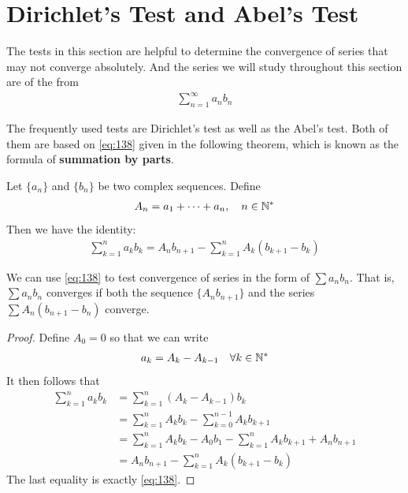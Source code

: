 \documentclass[thmcnt=section, 12pt]{my-elegantbook}
\begin{document}

\section{Dirichlet's Test and Abel's Test}

The tests in this section are helpful
to determine the convergence of series
that may not converge absolutely.
And the series we will study
throughout this section are of the from
\begin{align*}
    \sum_{n=1}^\infty a_n b_n
\end{align*}


The frequently used tests are Dirichlet's test
as well as the Abel's test.
Both of them are based on
\eqref{eq:138} given in the following theorem,
which is known as the formula of
\textbf{summation by parts}.

\begin{theorem} \label{thm:73}
    Let $\{a_n\}$ and $\{b_n\}$ be two complex sequences.
    Define
    \begin{align*}
        A_n = a_1 + \cdots + a_n,
        \quad n \in \mathbb{N}^\ast
    \end{align*}
    Then we have the identity:
    \begin{align}
        \sum_{k=1}^n a_k b_k
        = A_n b_{n+1}
        - \sum_{k=1}^n A_k (b_{k+1} - b_k)
        \label{eq:138}
    \end{align}
\end{theorem}

\begin{note}
    We can use \eqref{eq:138} to test convergence of
    series in the form of $\sum a_n b_n$.
    That is, $\sum a_n b_n$ converges
    if both the sequence $\{A_n b_{n+1}\}$
    and the series $\sum A_n(b_{n+1} - b_n)$ converge.
\end{note}

\begin{proof}
    Define $A_0 = 0$ so that we can write
    \begin{align*}
        a_k = A_{k} - A_{k-1}
        \quad \forall k \in \mathbb{N}^\ast
    \end{align*}
    It then follows that
    \begin{align*}
        \sum_{k=1}^n a_k b_k
         & = \sum_{k=1}^n (A_{k} - A_{k-1}) b_k \\
         & = \sum_{k=1}^n A_k b_k
        - \sum_{k=0}^{n-1} A_k b_{k+1}          \\
         & = \sum_{k=1}^n A_k b_k
        - A_0 b_1 - \sum_{k=1}^n A_k b_{k+1}
        + A_n b_{n+1}                           \\
         & =	A_n b_{n+1}
        - \sum_{k=1}^n A_k (b_{k+1} - b_k)
    \end{align*}
    The last equality is exactly \eqref{eq:138}.
\end{proof}
\end{document}
